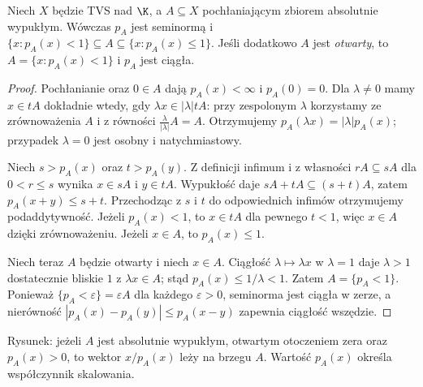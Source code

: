 \begin{twierdzenie}
\label{thm:minkowski}
Niech $X$ będzie TVS nad $\K$, a $A\subseteq X$
pochłaniającym zbiorem absolutnie wypukłym.
Wówczas $p_A$ jest seminormą i
$\{x:p_A(x)<1\}\subseteq A\subseteq\{x:p_A(x)\le1\}$.
Jeśli dodatkowo $A$ jest \emph{otwarty}, to
$A=\{x:p_A(x)<1\}$ i $p_A$ jest ciągła.
\end{twierdzenie}
\begin{proof}
Pochłanianie oraz $0\in A$ dają $p_A(x)<\infty$ i
$p_A(0)=0$. Dla $\lambda\ne0$ mamy
$x\in tA$ dokładnie wtedy, gdy $\lambda x\in|\lambda|tA$:
przy zespolonym $\lambda$ korzystamy ze zrównoważenia
$A$ i z równości $\frac{\lambda}{|\lambda|}A=A$.
Otrzymujemy $p_A(\lambda x)=|\lambda|p_A(x)$;
przypadek $\lambda=0$ jest osobny i natychmiastowy.

Niech $s>p_A(x)$ oraz $t>p_A(y)$. Z definicji infimum
i z własności $rA\subseteq sA$ dla $0<r\le s$
wynika $x\in sA$ i $y\in tA$. Wypukłość daje
$sA+tA\subseteq(s+t)A$, zatem
$p_A(x+y)\le s+t$. Przechodząc z $s$ i $t$ do
odpowiednich infimów otrzymujemy podaddytywność.
Jeżeli $p_A(x)<1$, to $x\in tA$ dla pewnego $t<1$,
więc $x\in A$ dzięki zrównoważeniu.
Jeżeli $x\in A$, to $p_A(x)\le1$.

Niech teraz $A$ będzie otwarty i niech $x\in A$.
Ciągłość $\lambda\mapsto\lambda x$ w $\lambda=1$
daje $\lambda>1$ dostatecznie bliskie $1$ z
$\lambda x\in A$; stąd $p_A(x)\le1/\lambda<1$.
Zatem $A=\{p_A<1\}$.
Ponieważ $\{p_A<\varepsilon\}=\varepsilon A$
dla każdego $\varepsilon>0$, seminorma jest ciągła
w zerze, a nierówność
$|p_A(x)-p_A(y)|\le p_A(x-y)$ zapewnia ciągłość wszędzie.
\end{proof}

\begin{center}

\small Rysunek: jeżeli $A$ jest absolutnie wypukłym,
otwartym otoczeniem zera oraz $p_A(x)>0$, to wektor
$x/p_A(x)$ leży na brzegu $A$. Wartość $p_A(x)$
określa współczynnik skalowania.
\end{center}

